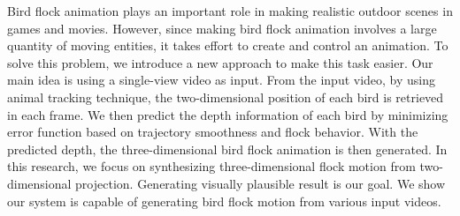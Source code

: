 Bird flock animation plays an important role in making realistic outdoor scenes in games and movies. However, since making bird flock animation involves a large quantity of moving entities, it takes effort to create and control an animation. To solve this problem, we introduce a new approach to make this task easier. Our main idea is using a single-view video as input.  From the input video, by using animal tracking technique, the two-dimensional position of each bird is retrieved in each frame. We then predict the depth information of each bird by minimizing error function based on trajectory smoothness and flock behavior. With the predicted depth, the three-dimensional bird flock animation is then generated. In this research, we focus on synthesizing three-dimensional flock motion from two-dimensional projection. Generating visually plausible result is our goal. We show our system is capable of generating bird flock motion from various input videos.